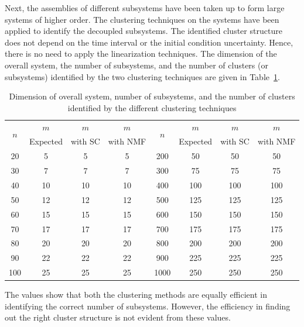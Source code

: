 Next, the assemblies of different subsystems have been taken up to form large systems of higher order. The clustering techniques on the systems have been applied to identify the decoupled subsystems. The identified cluster structure does not depend on the time interval or the initial condition uncertainty. Hence, there is no need to apply the linearization techniques. The dimension of the overall system, the number of subsystems, and the number of clusters (or subsystems) identified by the two clustering techniques are given in Table~\ref{linsyst_table}. 

\begin{table}[H]
\centering
\scriptsize{
\caption{Dimension of overall system, number of subsystems, and the number of clusters identified by the different clustering techniques}
\label{linsyst_table}
\begin{tabular}{|c|c|c|c|c|c|c|c|}
\hline 
\multirow{2}{*}{$n$} & $m$ & $m$ & $m$ & \multirow{2}{*}{$n$} & $m$ & $m$ & $m$ \\ \cline{2-4} \cline{6-8} 
& Expected & with SC & with NMF & & Expected & with SC & with NMF \\ \hline
20    &    5    &    5    &    5    &    200    &    50    &    50    &    50    \\ \hline
30    &    7    &    7    &    7    &    300    &    75    &    75    &    75    \\ \hline
40    &    10    &    10    &    10    &    400    &    100    &    100    &    100    \\ \hline
50    &    12    &    12    &    12    &    500    &    125    &    125    &    125    \\ \hline
60    &    15    &    15    &    15    &    600    &    150    &    150    &    150    \\ \hline
70    &    17    &    17    &    17    &    700    &    175    &    175    &    175    \\ \hline
80    &    20    &    20    &    20    &    800    &    200    &    200    &    200    \\ \hline
90    &    22    &    22    &    22    &    900    &    225    &    225    &    225    \\ \hline
100    &    25    &    25    &    25    &    1000    &    250    &    250    &    250    \\ \hline
\end{tabular}
} 
\end{table}

The values show that both the clustering methods are equally efficient in identifying the correct number of subsystems. However, the efficiency in finding out the right cluster structure is not evident from these values. 

